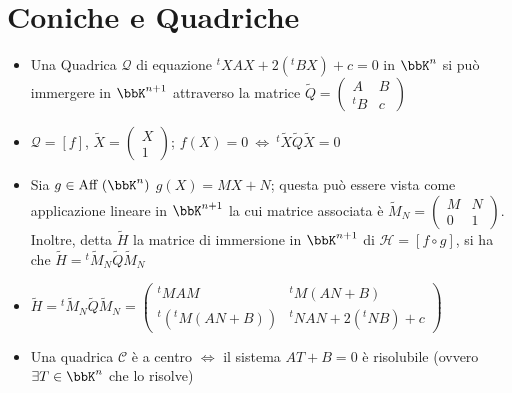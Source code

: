 \documentclass[a4paper,NoNotes]{stdmdoc}
\newcommand{\Aff}{\mbox{Aff }}
\newcommand{\sse}{\Leftrightarrow}
\begin{document}
	\section*{Coniche e Quadriche}
	\begin{itemize}
		\item Una Quadrica $\mathcal{Q}$ di equazione ${}^tXAX +2({}^tBX) +c = 0$ in $\bbK^n$ si può immergere in $\bbK^{n+1}$ attraverso la matrice $\widetilde{Q} = \left( \begin{array}{c|c} A & B \\ \hline {}^tB & c \end{array} \right) $
		\item $\mathcal{Q} = [f]$, $\widetilde{X} = \left(\begin{array}{c} X\\ \hline 1 \end{array} \right)$; $f(X)= 0 \ \sse \ {}^t\widetilde{X}\widetilde{Q}\widetilde{X}=0$
		\item Sia $g \in \Aff(\bbK^n)$ $g(X) = MX + N$; questa può essere vista come applicazione lineare in $\bbK^{n+1}$ la cui matrice associata è $\widetilde{M}_N = \left(\begin	{array}	{c|c} M & N\\ \hline 0 & 1\end{array} \right)$.
		Inoltre, detta $\widetilde{H}$ la matrice di immersione in $\bbK^{n+1}$ di $\mathcal{H} = [f \circ g]$, si ha che $\widetilde{H} = {}^t\widetilde{M}_N\widetilde{Q}\widetilde{M}_N$
		\item $\widetilde{H} = {}^t\widetilde{M}_N\widetilde{Q}\widetilde{M}_N = \left( \begin{array}{c|c} {}^tMAM & {}^tM(AN + B)\\ \hline {}^t({}^tM(AN + B)) & {}^tNAN + 2({}^tNB) + c \end{array} \right)$
		\item Una quadrica $\mathcal{C}$ è a centro $\sse$ il sistema $AT+B=0$ è risolubile (ovvero $\exists T \in \bbK^n$ che lo risolve)
	\end{itemize}
\end{document}
